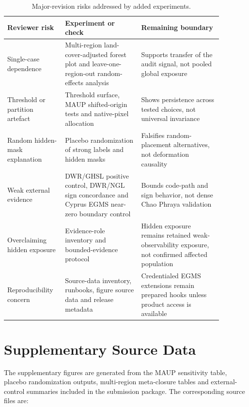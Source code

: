 \documentclass[11pt]{article}
\begin{document}
\begin{table}[htbp]
\centering
\caption{Major-revision risks addressed by added experiments.}
\label{tab:S2}
\scriptsize
\setlength{\tabcolsep}{3pt}
\renewcommand{\arraystretch}{0.92}
\begin{tabular}{p{0.22\linewidth}p{0.32\linewidth}p{0.34\linewidth}}
\toprule
Reviewer risk & Experiment or check & Remaining boundary \\
\midrule
Single-case dependence & Multi-region land-cover-adjusted forest plot and leave-one-region-out random-effects analysis & Supports transfer of the audit signal, not pooled global exposure \\
Threshold or partition artefact & Threshold surface, MAUP shifted-origin tests and native-pixel allocation & Shows persistence across tested choices, not universal invariance \\
Random hidden-mask explanation & Placebo randomization of strong labels and hidden masks & Falsifies random-placement alternatives, not deformation causality \\
Weak external evidence & DWR/GHSL positive control, DWR/NGL sign concordance and Cyprus EGMS near-zero boundary control & Bounds code-path and sign behavior, not dense Chao Phraya validation \\
Overclaiming hidden exposure & Evidence-role inventory and bounded-evidence protocol & Hidden exposure remains retained weak-observability exposure, not confirmed affected population \\
Reproducibility concern & Source-data inventory, runbooks, figure source data and release metadata & Credentialed EGMS extensions remain prepared hooks unless product access is available \\
\bottomrule
\end{tabular}
\end{table}

\section*{Supplementary Source Data}

The supplementary figures are generated from the MAUP sensitivity table, placebo randomization outputs, multi-region meta-closure tables and external-control summaries included in the submission package. The corresponding source files are:
\end{document}

